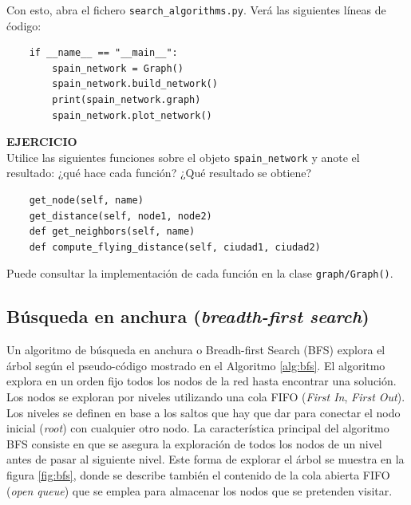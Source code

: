 \documentclass{article}
\begin{document}
\begin{exercise}
Con esto, abra el fichero \texttt{search\_algorithms.py}. Verá las siguientes líneas de ćodigo:
\begin{verbatim}
    if __name__ == "__main__":
        spain_network = Graph()
        spain_network.build_network()
        print(spain_network.graph)
        spain_network.plot_network()
\end{verbatim}
\textbf{EJERCICIO}\\
Utilice las siguientes funciones sobre el objeto \texttt{spain\_network} y anote el resultado: ¿qué hace cada función? ¿Qué resultado se obtiene?
\begin{verbatim}
    get_node(self, name)
    get_distance(self, node1, node2)
    def get_neighbors(self, name)
    def compute_flying_distance(self, ciudad1, ciudad2)
\end{verbatim}
Puede consultar la implementación de cada función en la clase \texttt{graph/Graph()}.
\end{exercise}



\subsection{Búsqueda en anchura (\textit{breadth-first search})}
Un algoritmo de búsqueda en anchura o Breadh-first Search (BFS) explora el árbol según el pseudo-código mostrado en el  Algoritmo \ref{alg:bfs}. El algoritmo explora en un orden fijo todos los nodos de la red hasta encontrar una solución. Los nodos se exploran por niveles utilizando una cola FIFO (\textit{First In}, \textit{First Out}). Los niveles se definen en base a los saltos que hay que dar para conectar el nodo inicial (\textit{root}) con cualquier otro nodo. 
La característica principal del algoritmo BFS consiste en que se asegura la exploración de todos los nodos de un nivel antes de pasar al siguiente nivel. Este forma de explorar el árbol se muestra en la figura \ref{fig:bfs}, donde se describe también el contenido de la cola abierta FIFO (\textit{open queue}) que se emplea para almacenar los nodos que se pretenden visitar.
\end{document}
